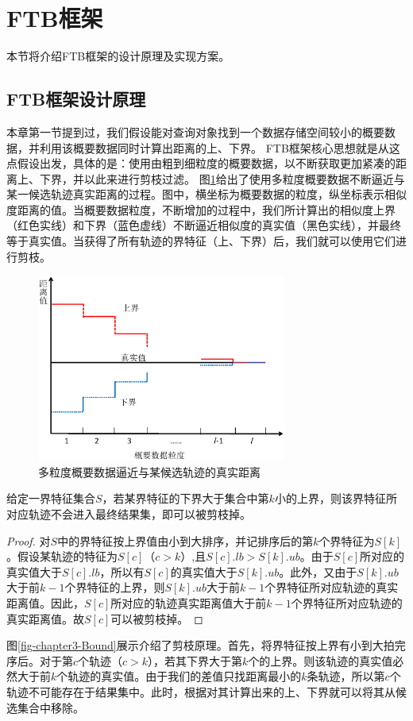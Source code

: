 \section{FTB框架}\label{sec-c3-FTB}
本节将介绍FTB框架的设计原理及实现方案。
\subsection{FTB框架设计原理}
本章第一节提到过，我们假设能对查询对象找到一个数据存储空间较小的概要数据，并利用该概要数据同时计算出距离的上、下界。
FTB框架核心思想就是从这点假设出发，具体的是：使用由粗到细粒度的概要数据，以不断获取更加紧凑的距离上、下界，并以此来进行剪枝过滤。
图\ref{fig-chapter3-FTB}给出了使用多粒度概要数据不断逼近与某一候选轨迹真实距离的过程。图中，横坐标为概要数据的粒度，纵坐标表示相似度距离的值。当概要数据粒度，不断增加的过程中，我们所计算出的相似度上界（红色实线）和下界（蓝色虚线）不断逼近相似度的真实值（黑色实线），并最终等于真实值。当获得了所有轨迹的界特征（上、下界）后，我们就可以使用它们进行剪枝。
\begin{figure}
	\centering
	\includegraphics[width=0.73\textwidth]{Fig/chapter3/FTB}
	\caption{多粒度概要数据逼近与某候选轨迹的真实距离}
	\label{fig-chapter3-FTB}
\end{figure}



\begin{lemma}
	给定一界特征集合$S$，若某界特征的下界大于集合中第$k$小的上界，则该界特征所对应轨迹不会进入最终结果集，即可以被剪枝掉。
\end{lemma}
\begin{proof}
	对$S$中的界特征按上界值由小到大排序，并记排序后的第$k$个界特征为$S[k]$。假设某轨迹的特征为$S[c]$（$c>k$）,且$S[c].lb>S[k].ub$。由于$S[c]$所对应的真实值大于$S[c].lb$，所以有$S[c]$的真实值大于$S[k].ub$。此外，又由于$S[k].ub$大于前$k-1$个界特征的上界，则$S[k].ub$大于前$k-1$个界特征所对应轨迹的真实距离值。因此，$S[c]$所对应的轨迹真实距离值大于前$k-1$个界特征所对应轨迹的真实距离值。故$S[c]$可以被剪枝掉。
\end{proof}
图\ref{fig-chapter3-Bound}展示介绍了剪枝原理。首先，将界特征按上界有小到大拍完序后。对于第$c$个轨迹（$c>k$），若其下界大于第$k$个的上界。则该轨迹的真实值必然大于前$k$个轨迹的真实值。由于我们的差值只找距离最小的$k$条轨迹，所以第$c$个轨迹不可能存在于结果集中。此时，根据对其计算出来的上、下界就可以将其从候选集合中移除。

